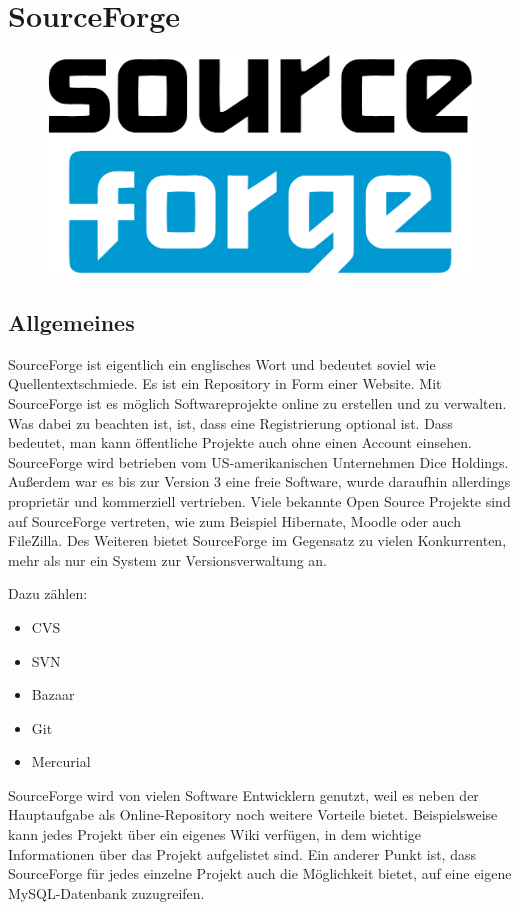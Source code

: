 


\section{SourceForge}

\begin{figure}[h]
\centering
\includegraphics[width=0.4\linewidth]{sourceforge-logo}
\end{figure}

\subsection{Allgemeines}

SourceForge ist eigentlich ein englisches Wort und bedeutet soviel wie \glqq Quellentextschmiede\grqq. Es ist ein Repository in Form einer Website. Mit SourceForge ist es möglich Softwareprojekte online zu erstellen und zu verwalten. Was dabei zu beachten ist, ist, dass eine Registrierung optional ist. Dass bedeutet, man kann öffentliche Projekte auch ohne einen Account einsehen. SourceForge wird betrieben vom US-amerikanischen Unternehmen \glqq Dice Holdings\grqq. Au{\ss}erdem war es bis zur Version 3 eine freie Software, wurde daraufhin allerdings proprietär und kommerziell vertrieben. Viele bekannte Open Source Projekte sind auf SourceForge vertreten, wie zum Beispiel Hibernate, Moodle oder auch FileZilla. Des Weiteren bietet SourceForge im Gegensatz zu vielen Konkurrenten, mehr als nur ein System zur Versionsverwaltung an. 

Dazu zählen: 
\begin{itemize}
	\item CVS
	\item SVN
	\item Bazaar
	\item Git
	\item Mercurial
\end{itemize}
\noindent
SourceForge wird von vielen Software Entwicklern genutzt, weil es neben der Hauptaufgabe als Online-Repository noch weitere Vorteile bietet. Beispielsweise kann jedes Projekt über ein eigenes Wiki verfügen, in dem wichtige Informationen über das Projekt aufgelistet sind. Ein anderer Punkt ist, dass SourceForge für jedes einzelne Projekt auch die Möglichkeit bietet, auf eine eigene MySQL-Datenbank zuzugreifen.

